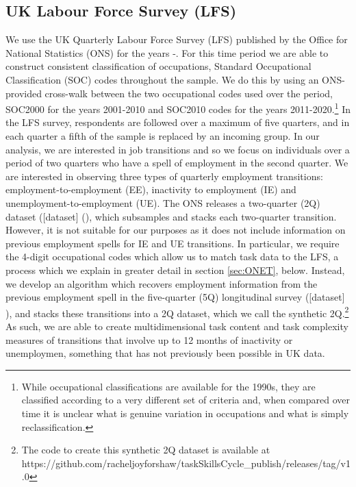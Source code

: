\documentclass[12pt,authoryear]{elsarticle}
\begin{document}
	
	
	\subsection{UK Labour Force Survey (LFS)}
	\label{sec:LFS}
	
	We use the UK Quarterly Labour Force Survey (LFS) published by the Office for National Statistics (ONS) for the years \hspace{-1mm}-\hspace{1mm}\hspace{-1.5mm}. For this time period we are able to construct consistent classification of occupations, Standard Occupational Classification (SOC) codes throughout the sample. We do this by using an ONS-provided cross-walk between the two occupational codes used over the period, SOC2000 for the years 2001-2010 and SOC2010 codes for the years 2011-2020.\footnote{While occupational classifications are available for the 1990s, they are classified according to a very different set of criteria and, when compared over time it is unclear what is genuine variation in occupations and what is simply reclassification.} 
	In the LFS survey, respondents are followed over a maximum of five quarters, and in each quarter a fifth of the sample is replaced by an incoming group. In our analysis, we are interested in job transitions and so we focus on individuals over a period of two quarters who have a spell of employment in the second quarter. We are interested in observing three types of quarterly employment transitions: employment-to-employment (EE), inactivity to employment (IE) and unemployment-to-employment (UE). The ONS releases a two-quarter (2Q) dataset ([dataset] (\cite{LFS2Q}), which subsamples and stacks each two-quarter transition. However, it is not suitable for our purposes as it does not include information on previous employment spells for IE and UE transitions. In particular, we require the 4-digit occupational codes which allow us to match task data to the LFS, a process which we explain in greater detail in section \ref{sec:ONET}, below. Instead, we develop an algorithm which recovers employment information from the previous employment spell in the five-quarter (5Q) longitudinal survey ([dataset] \cite{LFS5Q}), and stacks these transitions into a 2Q dataset, which we call the synthetic 2Q.\footnote{The code to create this synthetic 2Q dataset is available at https://github.com/racheljoyforshaw/taskSkillsCycle\_publish/releases/tag/v1.0} As such, we are able to create multidimensional task content and task complexity measures of transitions that involve up to 12 months of inactivity or unemploymen, something that has not previously been possible in UK data.
	
\end{document}
